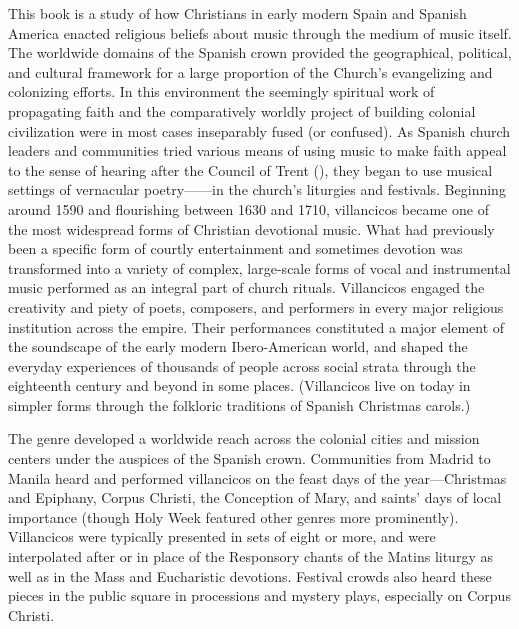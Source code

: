 This book is a study of how Christians in early modern Spain and Spanish
America enacted religious beliefs about music through the medium of music
itself.
The worldwide domains of the Spanish crown provided the geographical,
political, and cultural framework for a large proportion of the Church's
evangelizing and colonizing efforts. 
In this environment the seemingly spiritual work of propagating faith and the
comparatively worldly project of building colonial civilization were in most
cases inseparably fused (or confused).
As Spanish church leaders and communities tried various means of using music to
make faith appeal to the sense of hearing after the Council of Trent
(\XXX[years]), they began to use musical settings of vernacular
poetry------in the church's liturgies and festivals.
Beginning around 1590 and flourishing between 1630 and 1710, villancicos became
one of the most widespread forms of Christian devotional music. 
What had previously been a specific form of courtly entertainment and sometimes
devotion was transformed into a variety of complex, large-scale forms of vocal
and instrumental music performed as an integral part of church rituals.
Villancicos engaged the creativity and piety of poets, composers, and
performers in every major religious institution across the empire.
Their performances constituted a major element of the soundscape of the early
modern Ibero-American world, and shaped the everyday experiences of thousands
of people across social strata through the eighteenth century and beyond in
some places.
(Villancicos live on today in simpler forms through the folkloric traditions of
Spanish Christmas carols.)

The genre developed a worldwide reach across the colonial cities and mission
centers under the auspices of the Spanish crown. 
Communities from Madrid to Manila heard and performed villancicos on the
feast days of the year---Christmas and Epiphany, Corpus Christi, the Conception
of Mary, and saints' days of local importance (though Holy Week featured other
genres more prominently).
Villancicos were typically presented in sets of eight or more, and were
interpolated after or in place of the Responsory chants of the Matins liturgy
as well as in the Mass and Eucharistic devotions.
Festival crowds also heard these pieces in the public square in processions and
mystery plays, especially on Corpus Christi.

